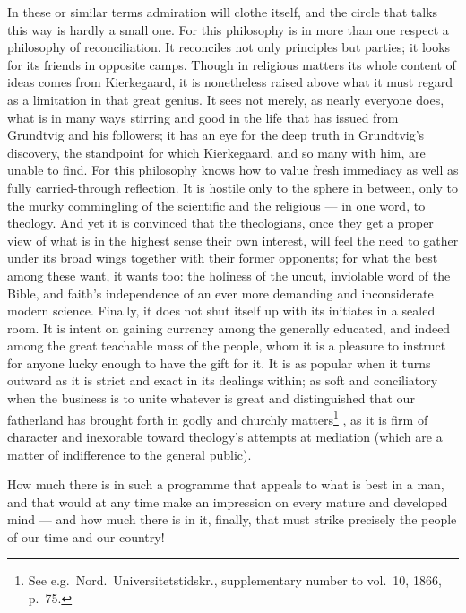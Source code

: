 \documentclass[12pt,a4paper]{book}
\renewcommand{\thefootnote}{*)}
\newcommand{\fnmark}[2]{\renewcommand{\thefootnote}{#1}\footnote{#2}%
  \renewcommand{\thefootnote}{*)}}
\newcommand{\opage}[1]{\marginnote{\footnotesize\textit{[#1]}}}
\begin{document}
In these or similar terms admiration will clothe itself, and the circle that
talks this way is hardly a small one. For this philosophy is in more than one
respect a philosophy of reconciliation. It reconciles
\opage{9}not only principles but parties; it looks for its friends in opposite
camps. Though in religious matters its whole content of ideas comes from
Kierkegaard, it is nonetheless raised above what it must regard as a limitation
in that great genius. It sees not merely, as nearly everyone does, what is in
many ways stirring and good in the life that has issued from Grundtvig and his
followers; it has an eye for the deep truth in Grundtvig's discovery, the
standpoint for which Kierkegaard, and so many with him, are unable to find. For
this philosophy knows how to value fresh immediacy as well as fully
carried-through reflection. It is hostile only to the sphere in between, only
to the murky commingling of the scientific and the religious --- in one word,
to theology. And yet it is convinced that the theologians, once they get a
proper view of what is in the highest sense their own interest, will feel the
need to gather under its broad wings together with their former opponents; for
what the best among these want, it wants too: the holiness of the uncut,
inviolable word of the Bible, and faith's independence of an ever more
demanding and inconsiderate modern science. Finally, it does not shut itself up
with its initiates in a sealed room. It is intent on gaining currency among the
generally educated, and indeed among the great teachable mass of the people,
whom it is a pleasure to instruct for anyone lucky enough to have the gift for
it. It is as popular
\opage{10}when it turns outward as it is strict and exact in its dealings
within; as soft and conciliatory when the business is to unite whatever is
great and distinguished that our fatherland has brought forth in godly and
churchly matters\fnmark{*)}{See e.g.\ Nord.\ Universitetstidskr., supplementary
number to vol.\ 10, 1866, p.\ 75.}, as it is firm of character and inexorable
toward theology's attempts at mediation (which are a matter of indifference to
the general public).

How much there is in such a programme that appeals to what is best in a man,
and that would at any time make an impression on every mature and developed
mind --- and how much there is in it, finally, that must strike precisely the
people of our time and our country!
\end{document}
